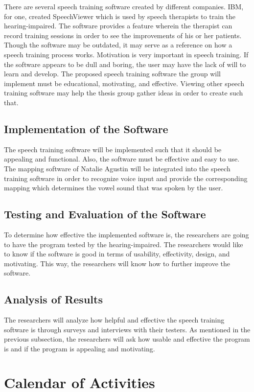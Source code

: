 There are several speech training software created by different companies. IBM, for one, created SpeechViewer which is used by speech  therapists to train the hearing-impaired. The software provides a feature wherein the therapist can record training sessions in order to see the improvements of his or her patients. Though the software may be outdated, it may serve as a reference on how a speech training process works. Motivation is very important in speech training. If the software appears to be dull and boring, the user may have the lack of will to learn and develop. The proposed speech training software the group will implement must be educational, motivating, and effective. Viewing other speech training software may help the thesis group gather ideas in order to create such that.

\subsection{Implementation of the Software}
The speech training software will be implemented such that it should be appealing and functional. Also, the software must be effective and easy to use. The mapping software of Natalie Agustin \citeyear{agustin:2014:SOM} will be integrated into the speech training software in order to recognize voice input and provide the corresponding mapping which determines the vowel sound that was spoken by the user.

\subsection{Testing and Evaluation of the Software}
To determine how effective the implemented software is, the researchers are going to have the program tested by the hearing-impaired. The researchers would like to know if the software is good in terms of usability, effectivity, design, and motivating. This way, the researchers will know how to further improve the software.

\subsection{Analysis of Results}
The researchers will analyze how helpful and effective the speech training software is through surveys and interviews with their testers. As mentioned in the previous subsection, the researchers will ask how usable and effective the program is and if the program is appealing and motivating.

\section{Calendar of Activities}

